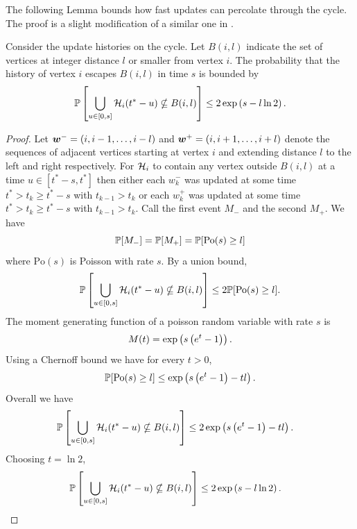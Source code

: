 	The following Lemma bounds how fast updates can percolate through the cycle. The proof is a slight modification of a similar one in \cite{Lubetzky2016-wd}.
	\begin{lemma}
	\label{lem:1D prob history contained in ball}
		Consider the update histories on the cycle.	Let $B(i, l)$ indicate the set of vertices at integer distance $l$ or smaller from vertex $i$. The probability that the history of vertex $i$ escapes $B(i,l)$ in time $s$ is bounded by
		\begin{equation}
			\mathbb{P}\left[\bigcup_{u \in [0, s]}\mathcal{H}_i(t^* - u) \nsubseteq B(i, l)\right] \leq 2\exp\left(s - l \ln 2 \right).
		\end{equation}
	\end{lemma}
	\begin{proof}
		Let ${\bm{{w}}}^- = (i, i-1, \dots, i- l)$ and ${\bm{{w}}}^+ = (i, i+1, \dots, i+ l)$ denote the sequences of adjacent vertices starting at vertex $i$ and extending distance $l$ to the left and right respectively. For $\mathcal{H}_i$ to contain any vertex outside $B(i, l)$ at a time $u \in [t^* - s, t^*]$ then either each $w_k^-$ was updated at some time $t^* > t_k \geq t^* - s$ with $t_{k-1} > t_k$ or each $w_k^+$ was updated at some time $t^* > t_k \geq t^* - s$ with $t_{k-1} > t_k$. Call the first event $M_-$ and the second $M_+$. We have
		\begin{equation}
			\mathbb{P}[M_-] = \mathbb{P}[M_+] = \mathbb{P}[\mathrm{Po}(s) \geq  l ]
		\end{equation}
		where $\mathrm{Po}(s)$ is Poisson with rate $s$. By a union bound,
		\begin{equation}
			\mathbb{P}\left[\bigcup_{u \in [0, s]}\mathcal{H}_i(t^* - u) \nsubseteq B(i, l)\right] \leq 2 \mathbb{P}[\mathrm{Po}(s) \geq  l].
		\end{equation}
		The moment generating function of a poisson random variable with rate $s$ is
		\begin{equation}
			M(t) = \exp\left(s\left(e^t - 1\right)\right).
		\end{equation}
		Using a Chernoff bound we have for every $t > 0$,
		\begin{equation}
			\mathbb{P}[\mathrm{Po}(s) \geq l] \leq \exp\left(s\left(e^t - 1\right) - t l\right).
		\end{equation}
		Overall we have
		\begin{align}
			\mathbb{P}\left[\bigcup_{u \in [0, s]}\mathcal{H}_i(t^* - u) \nsubseteq B(i, l)\right] &\leq 2\exp\left(s\left(e^t - 1\right) - t l\right).
		\end{align}
		Choosing $t = \ln 2$,
		\begin{align}
			\prob\left[\bigcup_{u \in [0, s]}\mathcal{H}_i(t^* - u) \nsubseteq B(i, l)\right] &\leq 2\exp\left(s - l \ln 2 \right).%
		\end{align}
	\end{proof}


